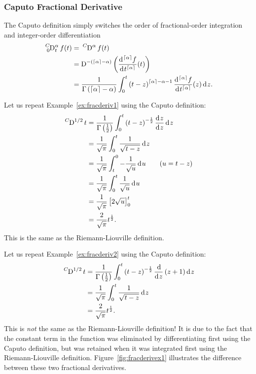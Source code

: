     \subsubsection{Caputo Fractional Derivative}
    The Caputo definition simply switches the order of fractional-order integration and integer-order differentiation
    \begin{equation}
      \begin{aligned}
	\tensor*[^{C}_0]{\D}{^\alpha_t}  f(t) &= \tensor*[^{C}]{\D}{^\alpha} f(t) \\
	&= \tensor*[]{\D}{^{-\left( \lc \alpha \rc - \alpha \right)}} \left( \frac{\d^{\lc \alpha \rc} f}{\d t^{\lc \alpha \rc}}(t) \right) \\ 
	&= 
	\frac{1}{\Gamma\left(\lc \alpha \rc - \alpha \right)} \int_0^t \left( t - z \right)^{\lc \alpha \rc - \alpha - 1}  \frac{\d^{\lc \alpha \rc}f}{\d t^{\lc \alpha \rc}} (z) \d z. 
      \end{aligned}
      \label{eq:caputodef}
    \end{equation}

    \begin{example}
      Let us repeat Example~\ref{ex:fracderiv1} using the Caputo definition:
      \begin{align*}
	\tensor*[^C]{\D}{^{1/2}} t &= \frac{1}{\Gamma \left( \frac{1}{2} \right) } \int_0^t \left( t - z \right)^{-\frac{1}{2}}
	\frac{\d z}{\d z} \d z \\
	&= \frac{1}{\sqrt{\pi}} \int_0^t \frac{1}{\sqrt{t - z}} \d z \\
	&= \frac{1}{\sqrt{\pi}} \int_t^0 -\frac{1}{\sqrt{u}} \d u \qquad (u = t - z) \\
	&= \frac{1}{\sqrt{\pi}} \int_0^t \frac{1}{\sqrt{u}} \d u \\
	&= \frac{1}{\sqrt{\pi}} \left[ 2 \sqrt{u} \right]_0^t \\
	&= \frac{2}{\sqrt{\pi}} t^\frac{1}{2}.
      \end{align*}
      This is the same as the Riemann-Liouville definition. 
      \label{ex:caputo1}
    \end{example}

    \begin{example}
      Let us repeat Example~\ref{ex:fracderiv2} using the Caputo definition:
      \begin{align*}
	\tensor*[^C]{\D}{^{1/2}} t &= \frac{1}{\Gamma \left( \frac{1}{2} \right) } \int_0^t \left( t - z \right)^{-\frac{1}{2}}
	\frac{\d }{\d z} \left( z + 1 \right) \d z \\
	&= \frac{1}{\sqrt{\pi}} \int_0^t \frac{1}{\sqrt{t - z}} \d z \\
	&= \frac{2}{\sqrt{\pi}} t^\frac{1}{2}.
      \end{align*}
      This is \emph{not} the same as the Riemann-Liouville definition! It is due to the fact that the constant term in the
      function was eliminated by differentiating first using the Caputo definition, but was retained when it was integrated
      first using the Riemann-Liouville definition. Figure~\ref{fig:fracderivex1} illustrates the difference between these two fractional derivatives. 
      \label{ex:fracderivex1} 
    \end{example}

